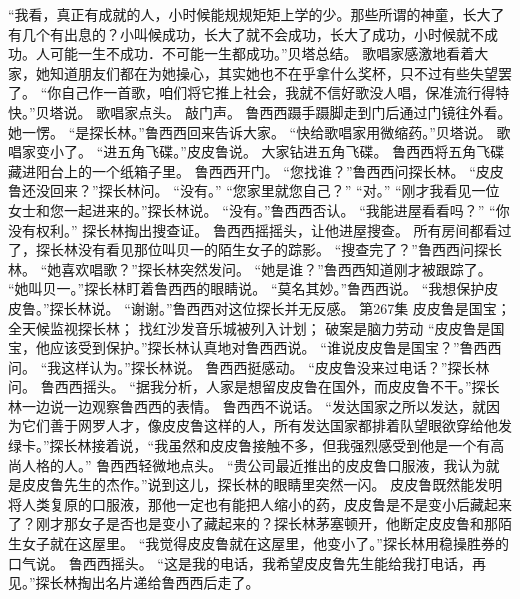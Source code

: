 \documentclass[a4paper,12pt,UTF8,twoside]{ctexbook}
\begin{document}
        “我看，真正有成就的人，小时候能规规矩矩上学的少。那些所谓的神童，长大了有几个有出息的？小叫候成功，长大了就不会成功，长大了成功，小时候就不成功。人可能一生不成功．不可能一生都成功。”贝塔总结。  
        歌唱家感激地看着大家，她知道朋友们都在为她操心，其实她也不在乎拿什么奖杯，只不过有些失望罢了。  
        “你自己作一首歌，咱们将它推上社会，我就不信好歌没人唱，保准流行得特快。”贝塔说。  
        歌唱家点头。  
        敲门声。  
        鲁西西蹑手蹑脚走到门后通过门镜往外看。她一愣。  
        “是探长林。”鲁西西回来告诉大家。  
        “快给歌唱家用微缩药。”贝塔说。  
        歌唱家变小了。  
        “进五角飞碟。”皮皮鲁说。  
        大家钻进五角飞碟。  
        鲁西西将五角飞碟藏进阳台上的一个纸箱子里。        
        鲁西西开门。  
        “您找谁？”鲁西西问探长林。  
        “皮皮鲁还没回来？”探长林问。  
        “没有。”  
        “您家里就您自己？”  
        “对。”  
        “刚才我看见一位女士和您一起进来的。”探长林说。  
        “没有。”鲁西西否认。  
        “我能进屋看看吗？”  
        “你没有权利。”  
        探长林掏出搜查证。  
        鲁西西摇摇头，让他进屋搜查。  
        所有房间都看过了，探长林没有看见那位叫贝一的陌生女子的踪影。  
        “搜查完了？”鲁西西问探长林。  
        “她喜欢唱歌？”探长林突然发问。  
        “她是谁？”鲁西西知道刚才被跟踪了。  
        “她叫贝一。”探长林盯着鲁西西的眼睛说。  
        “莫名其妙。”鲁西西说。  
        “我想保护皮皮鲁。”探长林说。  
        “谢谢。”鲁西西对这位探长并无反感。          第267集  
        皮皮鲁是国宝；  
        全天候监视探长林；  
        找红沙发音乐城被列入计划；  
        破案是脑力劳动    
        “皮皮鲁是国宝，他应该受到保护。”探长林认真地对鲁西西说。  
        “谁说皮皮鲁是国宝？”鲁西西问。  
        “我这样认为。”探长林说。  
        鲁西西挺感动。  
        “皮皮鲁没来过电话？”探长林问。  
        鲁西西摇头。  
        “据我分析，人家是想留皮皮鲁在国外，而皮皮鲁不干。”探长林一边说一边观察鲁西西的表情。  
        鲁西西不说话。  
        “发达国家之所以发达，就因为它们善于网罗人才，像皮皮鲁这样的人，所有发达国家都排着队望眼欲穿给他发绿卡。”探长林接着说，“我虽然和皮皮鲁接触不多，但我强烈感受到他是一个有高尚人格的人。”  
        鲁西西轻微地点头。  
        “贵公司最近推出的皮皮鲁口服液，我认为就是皮皮鲁先生的杰作。”说到这儿，探长林的眼睛里突然一闪。  
        皮皮鲁既然能发明将人类复原的口服液，那他一定也有能把人缩小的药，皮皮鲁是不是变小后藏起来了？刚才那女子是否也是变小了藏起来的？探长林茅塞顿开，他断定皮皮鲁和那陌生女子就在这屋里。  
        “我觉得皮皮鲁就在这屋里，他变小了。”探长林用稳操胜券的口气说。  
        鲁西西摇头。  
        “这是我的电话，我希望皮皮鲁先生能给我打电话，再见。”探长林掏出名片递给鲁西西后走了。  
\end{document}
